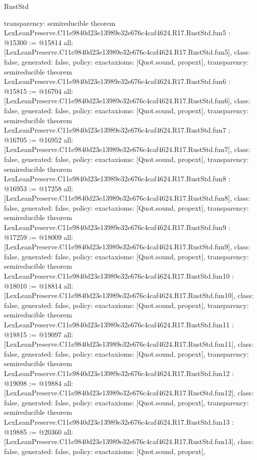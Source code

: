 \begin{lexlean}{RustStd}
\begin{coremodule}
{  transparency: semireducible
}
theorem LexLeanPreserve.C11e9840d23e13989e32e676c4caf4624.R17.RustStd.fun5 : @15300 := @15814 {
  all: [LexLeanPreserve.C11e9840d23e13989e32e676c4caf4624.R17.RustStd.fun5],
  class: false,
  generated: false,
  policy: exact{axioms: [Quot.sound, propext]},
  transparency: semireducible
}
theorem LexLeanPreserve.C11e9840d23e13989e32e676c4caf4624.R17.RustStd.fun6 : @15815 := @16704 {
  all: [LexLeanPreserve.C11e9840d23e13989e32e676c4caf4624.R17.RustStd.fun6],
  class: false,
  generated: false,
  policy: exact{axioms: [Quot.sound, propext]},
  transparency: semireducible
}
theorem LexLeanPreserve.C11e9840d23e13989e32e676c4caf4624.R17.RustStd.fun7 : @16705 := @16952 {
  all: [LexLeanPreserve.C11e9840d23e13989e32e676c4caf4624.R17.RustStd.fun7],
  class: false,
  generated: false,
  policy: exact{axioms: [Quot.sound, propext]},
  transparency: semireducible
}
theorem LexLeanPreserve.C11e9840d23e13989e32e676c4caf4624.R17.RustStd.fun8 : @16953 := @17258 {
  all: [LexLeanPreserve.C11e9840d23e13989e32e676c4caf4624.R17.RustStd.fun8],
  class: false,
  generated: false,
  policy: exact{axioms: [Quot.sound, propext]},
  transparency: semireducible
}
theorem LexLeanPreserve.C11e9840d23e13989e32e676c4caf4624.R17.RustStd.fun9 : @17259 := @18009 {
  all: [LexLeanPreserve.C11e9840d23e13989e32e676c4caf4624.R17.RustStd.fun9],
  class: false,
  generated: false,
  policy: exact{axioms: [Quot.sound, propext]},
  transparency: semireducible
}
theorem LexLeanPreserve.C11e9840d23e13989e32e676c4caf4624.R17.RustStd.fun10 : @18010 := @18814 {
  all: [LexLeanPreserve.C11e9840d23e13989e32e676c4caf4624.R17.RustStd.fun10],
  class: false,
  generated: false,
  policy: exact{axioms: [Quot.sound, propext]},
  transparency: semireducible
}
theorem LexLeanPreserve.C11e9840d23e13989e32e676c4caf4624.R17.RustStd.fun11 : @18815 := @19097 {
  all: [LexLeanPreserve.C11e9840d23e13989e32e676c4caf4624.R17.RustStd.fun11],
  class: false,
  generated: false,
  policy: exact{axioms: [Quot.sound, propext]},
  transparency: semireducible
}
theorem LexLeanPreserve.C11e9840d23e13989e32e676c4caf4624.R17.RustStd.fun12 : @19098 := @19884 {
  all: [LexLeanPreserve.C11e9840d23e13989e32e676c4caf4624.R17.RustStd.fun12],
  class: false,
  generated: false,
  policy: exact{axioms: [Quot.sound, propext]},
  transparency: semireducible
}
theorem LexLeanPreserve.C11e9840d23e13989e32e676c4caf4624.R17.RustStd.fun13 : @19885 := @20360 {
  all: [LexLeanPreserve.C11e9840d23e13989e32e676c4caf4624.R17.RustStd.fun13],
  class: false,
  generated: false,
  policy: exact{axioms: [Quot.sound, propext]},
}
\end{coremodule}
\end{lexlean}
